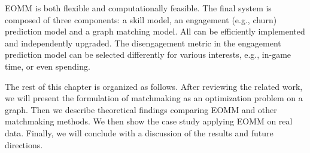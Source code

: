 

EOMM is both flexible and computationally feasible. The final system is composed of three components: a skill model, an engagement (e.g., churn) prediction model and a graph matching model. All can be efficiently implemented and independently upgraded. The disengagement metric in the engagement prediction model can be selected differently for various interests, e.g., in-game time, or even spending. 


The rest of this chapter is organized as follows. After reviewing the related work, we will present the formulation of matchmaking as an optimization problem on a graph. Then we describe theoretical findings comparing EOMM and other matchmaking methods. We then show the case study applying EOMM on real data. Finally, we will conclude with a discussion of the results and future directions.


